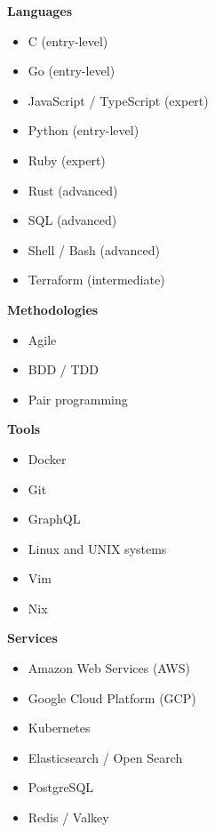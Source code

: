 \documentclass[9pt]{developercv} %
\begin{document}
\begin{minipage}[t]{0.3\textwidth} %
  \vspace{-\baselineskip}

  \textbf{Languages}
  \begin{itemize}
      \item C {\footnotesize (entry-level)}
      \item Go {\footnotesize (entry-level)}
      \item JavaScript / TypeScript {\footnotesize (expert)}
      \item Python {\footnotesize (entry-level)}
      \item Ruby {\footnotesize (expert)}
      \item Rust {\footnotesize (advanced)}
      \item SQL {\footnotesize (advanced)}
      \item Shell / Bash {\footnotesize (advanced)}
      \item Terraform {\footnotesize (intermediate)}
  \end{itemize}
\end{minipage}
\hfill
\begin{minipage}[t]{0.3\textwidth}
  \vspace{-\baselineskip}

  \textbf{Methodologies}
  \begin{itemize}
      \item Agile
      \item BDD / TDD
      \item Pair programming
  \end{itemize}

  \textbf{Tools}
  \begin{itemize}
      \item Docker
      \item Git
      \item GraphQL
      \item Linux and UNIX systems
      \item Vim
      \item Nix
  \end{itemize}
\end{minipage}
\hfill
\begin{minipage}[t]{0.3\textwidth}
  \vspace{-\baselineskip}

  \textbf{Services}
  \begin{itemize}
      \item Amazon Web Services (AWS)
      \item Google Cloud Platform (GCP)
      \item Kubernetes
      \item Elasticsearch / Open Search
      \item PostgreSQL
      \item Redis / Valkey
  \end{itemize}
\end{minipage}

\end{document}
